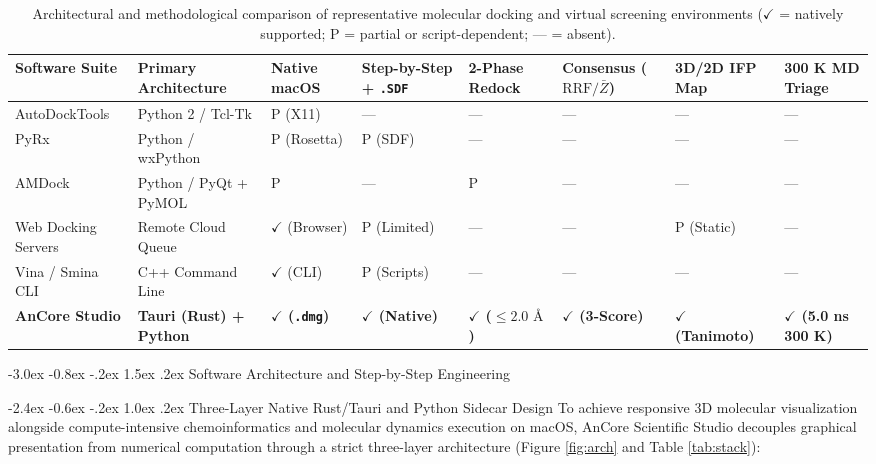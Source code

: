 \documentclass[11pt,a4paper]{article}
\makeatletter
\renewcommand{\section}{\@startsection{section}{1}{\z@}%
  {-3.0ex \@plus -0.8ex \@minus -.2ex}%
  {1.5ex \@plus.2ex}%
  {\normalfont\Large\bfseries\color{primary}}}
\renewcommand{\subsection}{\@startsection{subsection}{2}{\z@}%
  {-2.4ex \@plus -0.6ex \@minus -.2ex}%
  {1.0ex \@plus .2ex}%
  {\normalfont\large\bfseries\color{primary}}}
\makeatother
\begin{document}
\begin{table}[!htbp]
\centering
\caption{Architectural and methodological comparison of representative molecular docking and virtual screening environments ($\checkmark$ = natively supported; P = partial or script-dependent; --- = absent).}
\label{tab:comparison}
\vspace{2pt}
{\footnotesize
\renewcommand{\arraystretch}{1.24}
\begin{tabularx}{\textwidth}{L{2.7cm} L{2.2cm} C{1.3cm} C{1.5cm} C{1.4cm} C{1.4cm} C{1.4cm} Y}
\toprule
{}
\textbf{Software Suite} & \textbf{Primary Architecture} & \textbf{Native macOS} & \textbf{Step-by-Step + \texttt{.SDF}} & \textbf{2-Phase Redock} & \textbf{Consensus ($\text{RRF}/\bar{Z}$)} & \textbf{3D/2D IFP Map} & \textbf{300 K MD Triage} \\
\midrule
AutoDockTools & Python 2 / Tcl-Tk & P (X11) & --- & --- & --- & --- & --- \\
PyRx & Python / wxPython & P (Rosetta) & P (SDF) & --- & --- & --- & --- \\
AMDock & Python / PyQt + PyMOL & P & --- & P & --- & --- & --- \\
Web Docking Servers & Remote Cloud Queue & $\checkmark$ (Browser) & P (Limited) & --- & --- & P (Static) & --- \\
Vina / Smina CLI & C++ Command Line & $\checkmark$ (CLI) & P (Scripts) & --- & --- & --- & --- \\
\textbf{AnCore Studio} & \textbf{Tauri (Rust) + Python} & \textbf{$\checkmark$ (\texttt{.dmg})} & \textbf{$\checkmark$ (Native)} & \textbf{$\checkmark$ ($\le 2.0\text{ \AA}$)} & \textbf{$\checkmark$ (3-Score)} & \textbf{$\checkmark$ (Tanimoto)} & \textbf{$\checkmark$ (5.0 ns 300 K)} \\
\bottomrule
\end{tabularx}
}
\end{table}

\section{Software Architecture and Step-by-Step Engineering}

\subsection{Three-Layer Native Rust/Tauri and Python Sidecar Design}
\noindent To achieve responsive 3D molecular visualization alongside compute-intensive chemoinformatics and molecular dynamics execution on macOS, AnCore Scientific Studio decouples graphical presentation from numerical computation through a strict three-layer architecture (Figure \ref{fig:arch} and Table \ref{tab:stack}):
\end{document}
